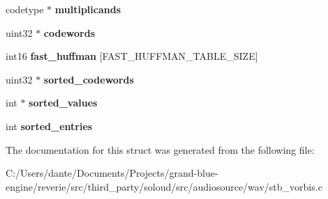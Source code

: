 \begin{DoxyCompactItemize}
\item 
\mbox{\label{struct_codebook_a6d20dcddba93d3df6f6c9f3c1fbcf8fd}} 
codetype $\ast$ {\bfseries multiplicands}
\item 
\mbox{\label{struct_codebook_a451075bbaced9845ae13a07f4696360a}} 
uint32 $\ast$ {\bfseries codewords}
\item 
\mbox{\label{struct_codebook_a5c6cba3f39227170f8f7806d0756b47f}} 
int16 {\bfseries fast\+\_\+huffman} \mbox{[}F\+A\+S\+T\+\_\+\+H\+U\+F\+F\+M\+A\+N\+\_\+\+T\+A\+B\+L\+E\+\_\+\+S\+I\+ZE\mbox{]}
\item 
\mbox{\label{struct_codebook_a4823cd33a7bc61b11af9ce1c2b6e569d}} 
uint32 $\ast$ {\bfseries sorted\+\_\+codewords}
\item 
\mbox{\label{struct_codebook_afd7e12e75d4a9ca547dd19590c888238}} 
int $\ast$ {\bfseries sorted\+\_\+values}
\item 
\mbox{\label{struct_codebook_a1833700bf5f00815e1f0f8b3ebb77045}} 
int {\bfseries sorted\+\_\+entries}
\end{DoxyCompactItemize}


The documentation for this struct was generated from the following file\+:\begin{DoxyCompactItemize}
\item 
C\+:/\+Users/dante/\+Documents/\+Projects/grand-\/blue-\/engine/reverie/src/third\+\_\+party/soloud/src/audiosource/wav/stb\+\_\+vorbis.\+c\end{DoxyCompactItemize}
